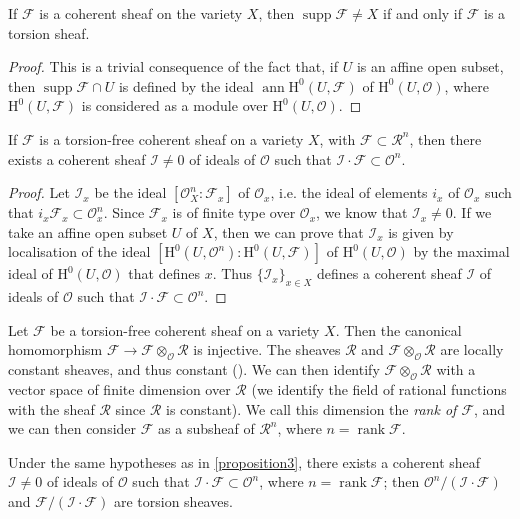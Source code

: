 \documentclass{article}
\theoremstyle{plain}
\newenvironment{proposition}[1]
    {\renewcommand\theinnercustomproposition{#1}\innercustomproposition}
    {\endinnercustomproposition}
\theoremstyle{definition}
\newcommand{\sh}{\mathscr}
\newcommand{\HH}{\mathrm{H}}
\DeclareMathOperator{\ann}{ann}
\DeclareMathOperator{\supp}{supp}
\DeclareMathOperator{\rank}{rank}
\begin{document}
\begin{proposition}{2}
\label{proposition2}
  If $\sh{F}$ is a coherent sheaf on the variety $X$, then $\supp\sh{F}\neq X$ if and only if $\sh{F}$ is a torsion sheaf.
\end{proposition}

\begin{proof}
  This is a trivial consequence of the fact that, if $U$ is an affine open subset, then $\supp\sh{F}\cap U$ is defined by the ideal $\ann\HH^0(U,\sh{F})$ of $\HH^0(U,\sh{O})$, where $\HH^0(U,\sh{F})$ is considered as a module over $\HH^0(U,\sh{O})$.
\end{proof}

\begin{proposition}{3}
\label{proposition3}
  If $\sh{F}$ is a torsion-free coherent sheaf on a variety $X$, with $\sh{F}\subset\sh{R}^n$, then there exists a coherent sheaf $\sh{I}\neq0$ of ideals of $\sh{O}$ such that $\sh{I}\cdot\sh{F}\subset\sh{O}^n$.
\end{proposition}

\begin{proof}
  Let $\sh{I}_x$ be the ideal $[\sh{O}_X^n:\sh{F}_x]$ of $\sh{O}_x$, i.e. the ideal of elements $i_x$ of $\sh{O}_x$ such that $i_x\sh{F}_x\subset\sh{O}_x^n$.
  Since $\sh{F}_x$ is of finite type over $\sh{O}_x$, we know that $\sh{I}_x\neq0$.
  If we take an affine open subset $U$ of $X$, then we can prove that $\sh{I}_x$ is given by localisation of the ideal $[\HH^0(U,\sh{O}^n):\HH^0(U,\sh{F})]$ of $\HH^0(U,\sh{O})$ by the maximal ideal of $\HH^0(U,\sh{O})$ that defines $x$.
  Thus $\{\sh{I}_x\}_{x\in X}$ defines a coherent sheaf $\sh{I}$ of ideals of $\sh{O}$ such that $\sh{I}\cdot\sh{F}\subset\sh{O}^n$.
\end{proof}

Let $\sh{F}$ be a torsion-free coherent sheaf on a variety $X$.
Then the canonical homomorphism $\sh{F}\to\sh{F}\otimes_{\sh{O}}\sh{R}$ is injective.
The sheaves $\sh{R}$ and $\sh{F}\otimes_{\sh{O}}\sh{R}$ are locally constant sheaves, and thus constant (\cite[page~229]{5}).
We can then identify $\sh{F}\otimes_{\sh{O}}\sh{R}$ with a vector space of finite dimension over $\sh{R}$ (we identify the field of rational functions with the sheaf $\sh{R}$ since $\sh{R}$ is constant).
We call this dimension the \emph{rank of $\sh{F}$}, and we can then consider $\sh{F}$ as a subsheaf of $\sh{R}^n$, where $n=\rank\sh{F}$.

\begin{proposition}{4}
\label{proposition4}
  Under the same hypotheses as in \cref{proposition3}, there exists a coherent sheaf $\sh{I}\neq0$ of ideals of $\sh{O}$ such that $\sh{I}\cdot\sh{F}\subset\sh{O}^n$, where $n=\rank\sh{F}$;
  then $\sh{O}^n/(\sh{I}\cdot\sh{F})$ and $\sh{F}/(\sh{I}\cdot\sh{F})$ are torsion sheaves.
\end{proposition}
\end{document}

